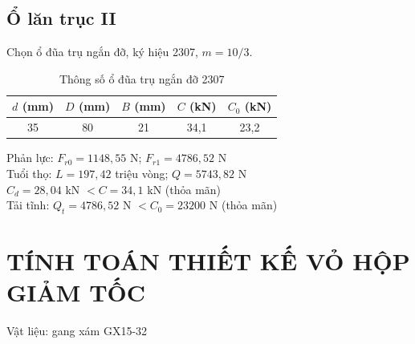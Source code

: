 \documentclass[12pt,a4paper]{report}
\begin{document}
\section{Ổ lăn trục II}
Chọn ổ đũa trụ ngắn đỡ, ký hiệu 2307, $m = 10/3$.
\begin{table}[H]
    \centering
    \caption{Thông số ổ đũa trụ ngắn đỡ 2307}
    \label{tab:4.5}
    \begin{tabular}{|c|c|c|c|c|}
        \hline
        $d$ (mm) & $D$ (mm) & $B$ (mm) & $C$ (kN) & $C_0$ (kN) \\
        \hline
        35 & 80 & 21 & 34,1 & 23,2 \\
        \hline
    \end{tabular}
\end{table}
Phản lực: $F_{r0} = 1148{,}55$ N; $F_{r1} = 4786{,}52$ N\\
Tuổi thọ: $L = 197{,}42$ triệu vòng; $Q = 5743{,}82$ N\\
$C_d = 28{,}04$ kN $< C = 34{,}1$ kN (thỏa mãn)\\
Tải tĩnh: $Q_t = 4786{,}52$ N $< C_0 = 23200$ N (thỏa mãn)

\chapter{TÍNH TOÁN THIẾT KẾ VỎ HỘP GIẢM TỐC}
Vật liệu: gang xám GX15-32
\end{document}
